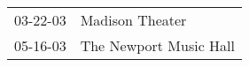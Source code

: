 \begin{supertabular}{p{0.07\textwidth}p{0.23\textwidth}}
 03-22-03 &         Madison Theater \\
 05-16-03 &  The Newport Music Hall \\
\end{supertabular}
